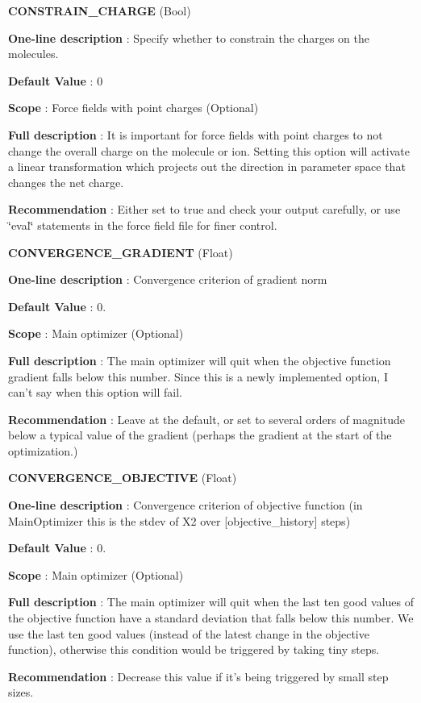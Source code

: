 \begin{DoxyItemize}
\item {\bfseries  C\-O\-N\-S\-T\-R\-A\-I\-N\-\_\-\-C\-H\-A\-R\-G\-E } (Bool) \par
{\bfseries  One-\/line description }\-: Specify whether to constrain the charges on the molecules. \par
{\bfseries  Default Value }\-: 0 \par
{\bfseries  Scope }\-: Force fields with point charges (Optional) \par
{\bfseries  Full description }\-: It is important for force fields with point charges to not change the overall charge on the molecule or ion. Setting this option will activate a linear transformation which projects out the direction in parameter space that changes the net charge. \par
{\bfseries  Recommendation }\-: Either set to true and check your output carefully, or use \char`\"{}eval\char`\"{} statements in the force field file for finer control.\end{DoxyItemize}
\begin{DoxyItemize}
\item {\bfseries  C\-O\-N\-V\-E\-R\-G\-E\-N\-C\-E\-\_\-\-G\-R\-A\-D\-I\-E\-N\-T } (Float) \par
{\bfseries  One-\/line description }\-: Convergence criterion of gradient norm \par
{\bfseries  Default Value }\-: 0. \par
{\bfseries  Scope }\-: Main optimizer (Optional) \par
{\bfseries  Full description }\-: The main optimizer will quit when the objective function gradient falls below this number. Since this is a newly implemented option, I can't say when this option will fail. \par
{\bfseries  Recommendation }\-: Leave at the default, or set to several orders of magnitude below a typical value of the gradient (perhaps the gradient at the start of the optimization.)\end{DoxyItemize}
\begin{DoxyItemize}
\item {\bfseries  C\-O\-N\-V\-E\-R\-G\-E\-N\-C\-E\-\_\-\-O\-B\-J\-E\-C\-T\-I\-V\-E } (Float) \par
{\bfseries  One-\/line description }\-: Convergence criterion of objective function (in Main\-Optimizer this is the stdev of X2 over \mbox{[}objective\-\_\-history\mbox{]} steps) \par
{\bfseries  Default Value }\-: 0. \par
{\bfseries  Scope }\-: Main optimizer (Optional) \par
{\bfseries  Full description }\-: The main optimizer will quit when the last ten good values of the objective function have a standard deviation that falls below this number. We use the last ten good values (instead of the latest change in the objective function), otherwise this condition would be triggered by taking tiny steps. \par
{\bfseries  Recommendation }\-: Decrease this value if it's being triggered by small step sizes.\end{DoxyItemize}
